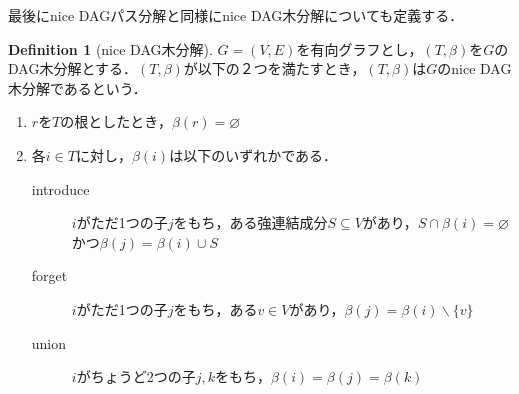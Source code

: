 \documentclass[master]{kuisthesis}		%
\theoremstyle{plain}
\theoremstyle{definition}
\newtheorem{definition*}{Definition}
\begin{document}
最後にnice DAGパス分解と同様にnice DAG木分解についても定義する．

\begin{definition*}[nice DAG木分解]
 $G=(V, E)$を有向グラフとし，$(T, \beta)$を$G$のDAG木分解とする．$(T, \beta)$が以下の２つを満たすとき，$(T, \beta)$は$G$のnice DAG木分解であるという．
 
\begin{enumerate}
    \item $r$を$T$の根としたとき，$\beta(r) = \varnothing$ 
    \item 各$i \in T$に対し，$\beta(i)$は以下のいずれかである．
    \begin{description}
          \item[introduce] $i$がただ1つの子$j$をもち，ある強連結成分$S \subseteq V$があり，$S \cap \beta(i) = \varnothing$かつ$\beta(j) = \beta(i) \cup S$
          \item[forget] $i$がただ1つの子$j$をもち，ある$v \in V$があり，$\beta(j) = \beta(i) \backslash \{v\}$
          \item[union] $i$がちょうど2つの子$j, k$をもち，$\beta(i) = \beta(j) = \beta(k)$
    \end{description}
    \end{enumerate}
\end{definition*}

\end{document}
